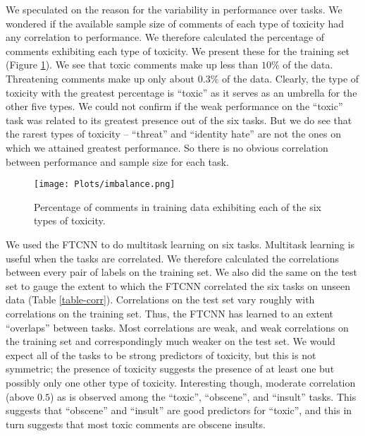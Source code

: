 \documentclass[12pt]{article}
\begin{document}
We speculated on the reason for the variability in performance over tasks. We wondered if the available sample size of comments of each type of toxicity had any correlation to performance. We therefore calculated the percentage of comments exhibiting each type of toxicity. We present these for the training set (Figure \ref{fig-imbalance}). We see that toxic comments make up less than $10\%$ of the data. Threatening comments make up only about $0.3\%$ of the data. Clearly, the type of toxicity with the greatest percentage is ``toxic'' as it serves as an umbrella for the other five types. We could not confirm if the weak performance on the ``toxic'' task was related to its greatest presence out of the six tasks. But we do see that the rarest types of toxicity -- ``threat'' and ``identity hate'' are not the ones on which we attained greatest performance. So there is no obvious correlation between performance and sample size for each task.

\begin{figure}
\centering
\texttt{[image: Plots/imbalance.png]}
\caption{\label{fig-imbalance} Percentage of comments in training data exhibiting each of the six types of toxicity.}
\end{figure}

We used the FTCNN to do multitask learning on six tasks. Multitask learning is useful when the tasks are correlated. We therefore calculated the correlations between every pair of labels on the training set. We also did the same on the test set to gauge the extent to which the FTCNN correlated the six tasks on unseen data (Table \ref{table-corr}). Correlations on the test set vary roughly with correlations on the training set. Thus, the FTCNN has learned to an extent ``overlaps'' between tasks. Most correlations are weak, and weak correlations on the training set and correspondingly much weaker on the test set. We would expect all of the tasks to be strong predictors of toxicity, but this is not symmetric; the presence of toxicity suggests the presence of at least one but possibly only one other type of toxicity. Interesting though, moderate correlation (above $0.5$) as is observed among the ``toxic'', ``obscene'', and ``insult'' tasks. This suggests that ``obscene'' and ``insult'' are good predictors for ``toxic'', and this in turn suggests that most toxic comments are obscene insults.
\end{document}
